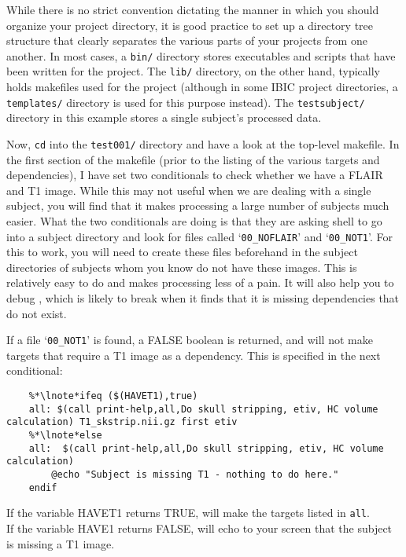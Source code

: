 While there is no strict convention dictating the manner in which you should organize your project directory, it is good practice to set up a directory tree structure that clearly separates the various parts of your projects from one another. In most cases, a \texttt{bin/} directory stores executables and scripts that have been written for the project. The \texttt{lib/} directory, on the other hand, typically holds makefiles used for the project (although in some IBIC project directories, a \texttt{templates/} directory is used for this purpose instead). The \texttt{testsubject/} directory in this example stores a single subject's processed data.

Now, \texttt{cd} into the \texttt{test001/} directory and have a look at the top-level makefile. In the first section of the makefile (prior to the listing of the various targets and dependencies), I have set two conditionals to check whether we have a FLAIR and T1 image. While this may not useful when we are dealing with a single subject, you will find that it makes processing a large number of subjects much easier. What the two conditionals are doing is that they are asking shell to go into a subject directory and look for files called `\texttt{00_NOFLAIR}' and `\texttt{00_NOT1}'. For this to work, you will need to create these files beforehand in the subject directories of subjects whom you know do not have these images. This is relatively easy to do and makes processing less of a pain. It will also help you to debug \maken{}, which is likely to break when it finds that it is missing dependencies that do not exist.  
	
If a file `\texttt{00_NOT1}' is found, a FALSE boolean is returned, and \maken{} will not make targets that require a T1 image as a dependency. This is specified in the next conditional:
\begin{lstlisting}
	%*\lnote*ifeq ($(HAVET1),true)
	all: $(call print-help,all,Do skull stripping, etiv, HC volume calculation) T1_skstrip.nii.gz first etiv
	%*\lnote*else
	all:  $(call print-help,all,Do skull stripping, etiv, HC volume calculation)
		@echo "Subject is missing T1 - nothing to do here."
	endif
\end{lstlisting}

If the variable HAVET1 returns TRUE, \maken{} will make the targets listed in \texttt{all}.\\
\indent{}If the variable HAVE1 returns FALSE, \maken{} will echo to your screen that the subject is missing a T1 image.

